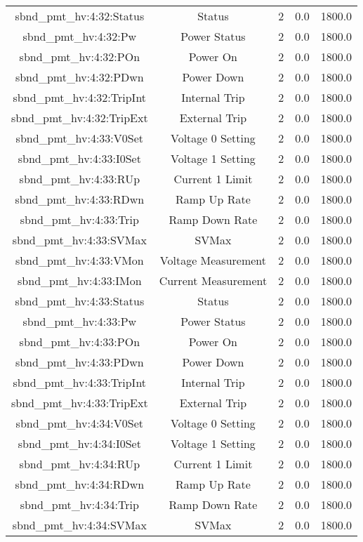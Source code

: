 \begin{center}
\begin{longtable}{c | c c c c }
sbnd\_pmt\_hv:4:32:Status & Status & 2 & 0.0 & 1800.0\\ 
sbnd\_pmt\_hv:4:32:Pw & Power Status & 2 & 0.0 & 1800.0\\ 
sbnd\_pmt\_hv:4:32:POn & Power On & 2 & 0.0 & 1800.0\\ 
sbnd\_pmt\_hv:4:32:PDwn & Power Down & 2 & 0.0 & 1800.0\\ 
sbnd\_pmt\_hv:4:32:TripInt & Internal Trip & 2 & 0.0 & 1800.0\\ 
sbnd\_pmt\_hv:4:32:TripExt & External Trip & 2 & 0.0 & 1800.0\\ 
sbnd\_pmt\_hv:4:33:V0Set & Voltage 0 Setting & 2 & 0.0 & 1800.0\\ 
sbnd\_pmt\_hv:4:33:I0Set & Voltage 1 Setting & 2 & 0.0 & 1800.0\\ 
sbnd\_pmt\_hv:4:33:RUp & Current 1 Limit & 2 & 0.0 & 1800.0\\ 
sbnd\_pmt\_hv:4:33:RDwn & Ramp Up Rate & 2 & 0.0 & 1800.0\\ 
sbnd\_pmt\_hv:4:33:Trip & Ramp Down Rate & 2 & 0.0 & 1800.0\\ 
sbnd\_pmt\_hv:4:33:SVMax & SVMax & 2 & 0.0 & 1800.0\\ 
sbnd\_pmt\_hv:4:33:VMon & Voltage Measurement & 2 & 0.0 & 1800.0\\ 
sbnd\_pmt\_hv:4:33:IMon & Current Measurement & 2 & 0.0 & 1800.0\\ 
sbnd\_pmt\_hv:4:33:Status & Status & 2 & 0.0 & 1800.0\\ 
sbnd\_pmt\_hv:4:33:Pw & Power Status & 2 & 0.0 & 1800.0\\ 
sbnd\_pmt\_hv:4:33:POn & Power On & 2 & 0.0 & 1800.0\\ 
sbnd\_pmt\_hv:4:33:PDwn & Power Down & 2 & 0.0 & 1800.0\\ 
sbnd\_pmt\_hv:4:33:TripInt & Internal Trip & 2 & 0.0 & 1800.0\\ 
sbnd\_pmt\_hv:4:33:TripExt & External Trip & 2 & 0.0 & 1800.0\\ 
sbnd\_pmt\_hv:4:34:V0Set & Voltage 0 Setting & 2 & 0.0 & 1800.0\\ 
sbnd\_pmt\_hv:4:34:I0Set & Voltage 1 Setting & 2 & 0.0 & 1800.0\\ 
sbnd\_pmt\_hv:4:34:RUp & Current 1 Limit & 2 & 0.0 & 1800.0\\ 
sbnd\_pmt\_hv:4:34:RDwn & Ramp Up Rate & 2 & 0.0 & 1800.0\\ 
sbnd\_pmt\_hv:4:34:Trip & Ramp Down Rate & 2 & 0.0 & 1800.0\\ 
sbnd\_pmt\_hv:4:34:SVMax & SVMax & 2 & 0.0 & 1800.0\\ 

\end{longtable}
\end{center}
